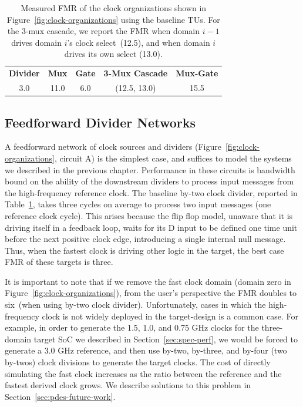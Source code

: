 \begin{table}[t]
\centering
    \begin{tabular}{c c c c c}
    \hline
          \textbf{Divider} & \textbf{Mux} & \textbf{Gate} & \textbf{3-Mux Cascade} & \textbf{Mux-Gate} \\
          3.0 & 11.0 & 6.0 & (12.5, 13.0) & 15.5 \\
    \hline
    \end{tabular}
    \caption{Measured FMR of the clock organizations shown in Figure~\ref{fig:clock-organizations} using the baseline TUs.
    For the 3-mux cascade, we report the FMR when domain $i-1$ drives domain $i$'s
    clock select~(12.5), and when domain $i$ drives its own select (13.0).}
    \label{tbl:pdes-baseline-fmrs}
\end{table}

\subsection{Feedforward Divider Networks}

A feedforward network of clock sources and dividers
(Figure~\ref{fig:clock-organizations}, circuit A) is the simplest case, and
suffices to model the systems we described in the previous chapter. Performance
in these circuits is bandwidth bound on the ability of the downstream dividers
to process input messages from the high-frequency reference clock. The baseline
by-two clock divider, reported in Table~\ref{tbl:pdes-baseline-fmrs}, takes three cycles on average to process two input
messages (one reference clock cycle). This arises because the flip flop model, unaware
that it is driving itself in a feedback loop, waits for its D input to be defined one time unit
before the next positive clock edge, introducing a single internal null
message. Thus, when the fastest clock is driving other logic in the target, the
best case FMR of these targets is three.

It is important to note that if we remove the fast clock domain (domain zero in
Figure~\ref{fig:clock-organizations}), from the user's perspective the FMR
doubles to six~(when using by-two clock divider). Unfortunately, cases in which
the high-frequency clock is not widely deployed in the target-design is a
common case. For example, in order to generate the 1.5, 1.0, and 0.75 GHz
clocks for the three-domain target SoC we described in
Section~\ref{sec:spec-perf}, we would be forced to generate a 3.0 GHz
reference, and then use by-two, by-three, and by-four (two by-twos) clock divisions to generate
the target clocks. The cost of directly simulating the fast clock increases as
the ratio between the reference and the fastest derived clock grows. We
describe solutions to this problem in Section~\ref{sec:pdes-future-work}.

